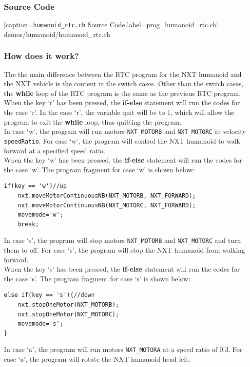 \documentclass[11pt]{article}
\begin{document}
\subsubsection*{Source Code}

[caption={{\tt humanoid\_rtc.ch} Source Code},label=prog_humanoid_rtc.ch]
{demos/humanoid/humanoid_rtc.ch}

\subsubsection*{How does it work?}
The the main difference between the RTC program for the NXT humanoid and the 
NXT vehicle is the content in the switch cases. Other than the switch cases, 
the {\bf while} loop of the RTC program is the same as the previous RTC 
program. When the key `r' has been pressed, the {\bf if-else} 
statement will run the codes for the case `r'. In the case `r', the variable 
quit will be to 1, which will allow the program to exit the {\bf while} loop, 
thus quitting the program.\\
In case `w', the program will run motors {\tt NXT\_MOTORB} and {\tt NXT\_MOTORC} 
at velocity {\tt speedRatio}. For case `w', the program will control the NXT 
humanoid to walk forward at a specified speed ratio.\\

When the key `w' has been pressed, the {\bf if-else} statement will 
run the codes for the case `w'. The program fragment for case `w' is shown 
below:
\begin{lstlisting}
if(key == 'w')//up
    nxt.moveMotorContinuousNB(NXT_MOTORB, NXT_FORWARD);
    nxt.moveMotorContinuousNB(NXT_MOTORC, NXT_FORWARD);
    movemode='w';
    break;
\end{lstlisting}
In case `s', the program will stop motors {\tt NXT\_MOTORB} and {\tt NXT\_MOTORC} 
and turn them to off. For case `s', the program will stop the NXT humanoid from 
walking forward.\\

When the key `s' has been pressed, the {\bf if-else} statement will run 
the codes for the case `s'. The program fragment for case `s' is shown below:
\begin{lstlisting}
else if(key == 's'){//down
    nxt.stopOneMotor(NXT_MOTORB);
    nxt.stopOneMotor(NXT_MOTORC);
    movemode='s';
}
\end{lstlisting}
In case `a', the program will run motors {\tt NXT\_MOTORA} at a speed ratio of 
0.3. For case `a', the program will rotate the NXT humanoid head left.\\
\end{document}

